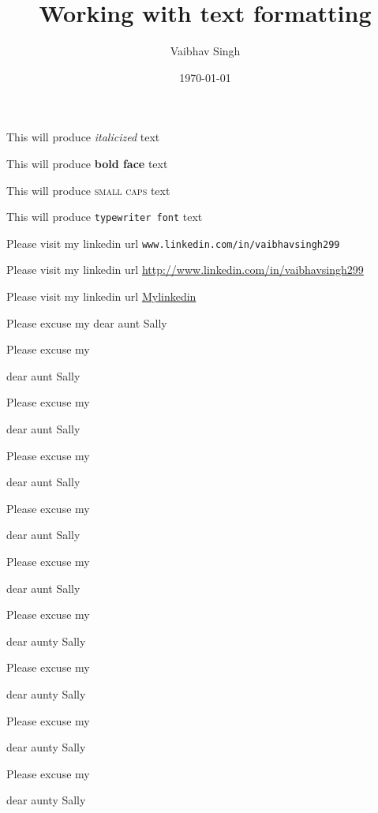 \documentclass[11pt]{article}
\title{Working with text formatting}
\author{Vaibhav Singh}
\date{\today}
\begin{document}
\tableofcontents
\maketitle
This will produce \textit{italicized} text

This will produce \textbf{bold face} text

This will produce \textsc{small caps} text

This will produce \texttt{typewriter font} text

Please visit my linkedin url \texttt{www.linkedin.com/in/vaibhavsingh299}

Please visit my linkedin url \url{http://www.linkedin.com/in/vaibhavsingh299}

Please visit my linkedin url \href{http://www.linkedin.com/in/vaibhavsingh299}{Mylinkedin}

\vspace{1cm}
Please excuse my dear aunt Sally

Please excuse my \begin{large}dear aunt Sally\end{large}

Please excuse my \begin{Large}dear aunt Sally\end{Large}

Please excuse my \begin{LARGE}dear aunt Sally\end{LARGE}

Please excuse my \begin{huge}dear aunt Sally\end{huge}

Please excuse my \begin{Huge}dear aunt Sally\end{Huge}

Please excuse my \begin{normalsize}dear aunty Sally\end{normalsize}

Please excuse my \begin{small}dear aunty Sally\end{small}

Please excuse my \begin{scriptsize}dear aunty Sally\end{scriptsize}

Please excuse my \begin{tiny}dear aunty Sally\end{tiny}
\end{document}
